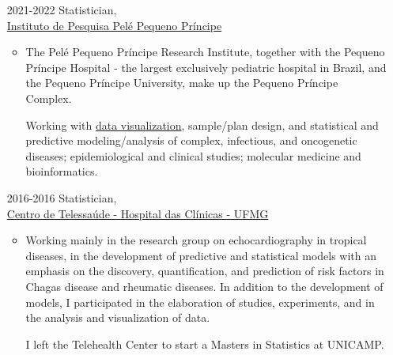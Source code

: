 \documentclass[12pt]{article}
\begin{document}
\newpage
\begin{itemize}
  \item[2021-2022] Statistician,\\
              \href{http://www.pelepequenoprincipe.org.br/}{\color{blue}
                   Instituto de Pesquisa Pel\'{e} Pequeno Pr\'{i}ncipe}
  \begin{itemize}
  \item The Pelé Pequeno Príncipe Research Institute, together with the
        Pequeno Príncipe Hospital - the largest exclusively pediatric
        hospital in Brazil, and the Pequeno Príncipe University, make up
        the Pequeno Príncipe Complex.

        Working with \href{https://henriquelaureano.github.io/visualizations/}{\color{blue}data visualization},
        sample/plan design, and statistical and predictive
        modeling/analysis of complex, infectious, and oncogenetic
        diseases; epidemiological and clinical studies; molecular
        medicine and bioinformatics.
  \end{itemize}

 \item[2016-2016] Statistician,\\
                  \href{https://telessaude.hc.ufmg.br/}{\color{blue}
                    Centro de Telessa\'{u}de -
                    Hospital das Cl\'{i}nicas - UFMG}
  \begin{itemize}
   \item Working mainly in the research group on echocardiography in
         tropical diseases, in the development of predictive and
         statistical models with an emphasis on the discovery,
         quantification, and prediction of risk factors in Chagas
         disease and rheumatic diseases. In addition to the development
         of models, I participated in the elaboration of studies,
         experiments, and in the analysis and visualization of data.

         I left the Telehealth Center to start a Masters in Statistics
         at UNICAMP.
  \end{itemize}
\end{itemize}
\end{document}
